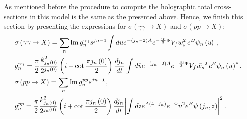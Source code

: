 \documentclass[a4paper,12pt]{article}
\begin{document}
As mentioned before the procedure to compute the holographic total cross-sections in this model is the same as the presented above. Hence, we finish this section by presenting the expressions for $\sigma\left(\gamma \gamma \to X\right)$ and $\sigma\left(p p \to X\right)$:
\begin{align}
&\sigma\left(\gamma \gamma \rightarrow X\right) =  \sum_n {\rm Im} \, g^{\gamma \gamma}_n s^{jn-1} \int du e^{-\left(j_n - 2 \right)A } e^{-\frac{10}{3} \Phi} V_f w_s^2  \, e^B \psi_n\left(u\right)  \, , \label{eq:sigma_gg_hol_gens}  \\
&g^{\gamma \gamma}_n = \frac{\pi}{2} \frac{k^2_{j_n\left(0\right)}}{2^{j_n\left(0\right)}}  \left(i + \cot \frac{\pi j_n\left(0\right)}{2} \right) \frac{d j_n}{dt}  \int d\bar{u} e^{-\left(j_n - 2 \right)\bar{A} } e^{-\frac{10}{3} \bar{\Phi}} \bar{V_f} \bar{w_s}^2  \, e^{\bar{B}} {\psi_n\left(u\right)}^{*} \, , \label{eq:gg_couplings_def} \\
& \sigma\left( p p \to X \right) = \sum_n {\rm Im} \, g^{p p}_n s^{jn-1}  \, , \label{eq:sigma_pp_hol_gens} \\
&g^{p p}_n = \frac{\pi}{2} \frac{\bar{k}^2_{j_n\left(0\right)}}{2^{j_n\left(0\right)}}  \left(i + \cot \frac{\pi j_n\left(0\right)}{2} \right) \frac{d j_n}{dt} {\left| \int dz  e^{A\left( 4 - j_n \right)} e^{-\Phi}  {\bar{\upsilon}}^2 e^{B}  {\psi\left(j_n, z\right)} \right|}^2  \, \label{eq:pp_couplings_def} .
\end{align}
\end{document}

